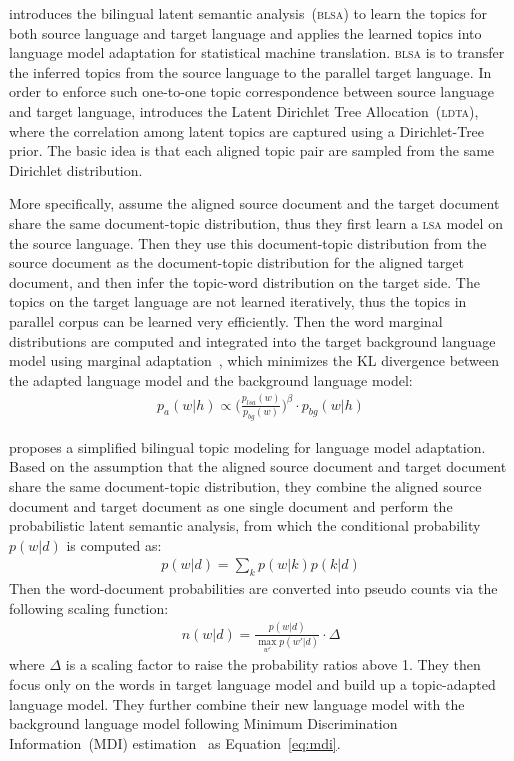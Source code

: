 \cite{Tam-2007} introduces the bilingual latent semantic analysis~(\textsc{blsa}) to learn the topics for both source language and target language and applies the learned topics into language model adaptation for statistical machine translation. \textsc{blsa} is to transfer the inferred topics from the source language to the parallel target language. In order to enforce such one-to-one topic correspondence between source language and target language, \cite{Tam-2007} introduces the Latent Dirichlet Tree Allocation~(\textsc{ldta}), where the correlation among latent topics are captured using a Dirichlet-Tree prior. The basic idea is that each aligned topic pair are sampled from the same Dirichlet distribution.

More specifically, \cite{Tam-2007} assume the aligned source document and the target document share the same document-topic distribution, thus they first learn a \textsc{lsa} model on the source language. Then they use this document-topic distribution from the source document as the document-topic distribution for the aligned target document, and then infer the topic-word distribution on the target side. The topics on the target language are not learned iteratively, thus the topics in parallel corpus can be learned very efficiently. Then the word marginal distributions are computed and integrated into the target background language model using marginal adaptation~\citep{Kneser-1997b}, which minimizes the KL divergence between the adapted language model and the background language model:
\begin{align}
\label{eq:mdi}
p_a(w|h) \propto \Big( \frac{p_{lsa}(w)}{p_{bg}(w)} \Big) ^{\beta} \cdot p_{bg}(w|h)
\end{align}

\cite{Ruiz-2011} proposes a simplified bilingual topic modeling for language model adaptation. Based on the assumption that the aligned source document and target document share the same document-topic distribution, they combine the aligned source document and target document as one single document and perform the probabilistic latent semantic analysis, from which the conditional probability $p(w|d)$ is computed as:
\begin{align}
p(w|d) = \sum_k p(w|k) p(k|d)
\end{align}
Then the word-document probabilities are converted into pseudo counts via the following scaling function:
\begin{align}
n(w|d) = \frac{p(w|d)}{\max_{w'} p(w'|d)} \cdot \Delta
\end{align}
where $\Delta$ is a scaling factor to raise the probability ratios above 1. They then focus only on the words in target language model and build up a topic-adapted language model. They further combine their new language model with the background language model following Minimum Discrimination Information~(\textsc{MDI}) estimation~\cite{Kneser-1997b} as Equation~\ref{eq:mdi}. 

